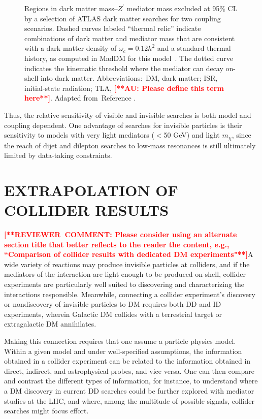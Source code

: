 \documentclass{ar-1col}
\newcommand{\chiDM}{\ensuremath{\chi}\xspace}
\newcommand{\IP}{invisible particle}
\newcommand{\mdm}{\ensuremath{m_{\chiDM}}\xspace}
\newcommand{\Zprime}{\ensuremath{{Z}^\prime}\xspace}
\begin{document}
\begin{figure}[!htpb]
\caption{Regions in dark matter mass--\Zprime mediator mass
excluded at 95\% CL by a selection of ATLAS dark matter searches
for two coupling scenarios. Dashed curves labeled ``thermal
relic'' indicate combinations of dark matter and mediator mass
that are consistent with a dark matter density of $\omega_c = 0.12
h^2$ and a standard thermal history, as computed in MadDM for this
model~\cite{Backovic:2015cra}. The dotted curve indicates the
kinematic threshold where the mediator can decay on-shell into
dark matter. Abbreviations:\ DM, dark matter; ISR, initial-state radiation; TLA, \textbf{\textcolor{red}{[**AU: Please define this term here**]}}. Adapted from~Reference .}
\label{fig:sensitivityComparison}
\end{figure}

Thus, the relative sensitivity of visible and invisible searches
is both model and coupling dependent. One advantage of
searches for {\IP}s is their sensitivity to models
with very light mediators ($<$50 GeV) and light \mdm, since the
reach of dijet and dilepton searches to low-mass resonances is
still ultimately limited by data-taking constraints.

\section{EXTRAPOLATION OF COLLIDER RESULTS}\label{sec:04_Extrapolation}

\textbf{\textcolor{red}{[**REVIEWER\ COMMENT: Please consider using an alternate section title that better reflects to the reader the content, e.g., ``Comparison of collider results with dedicated DM experiments"**]}}A wide variety of reactions may produce {\IP}s at colliders, and
if the mediators of the interaction are light enough to be
produced on-shell, collider experiments are particularly well suited to
discovering and characterizing the interactions responsible.
Meanwhile, connecting a collider experiment's discovery or
nondiscovery of {\IP}s to DM requires both DD and
ID experiments, wherein Galactic DM
collides with a terrestrial target or extragalactic DM
annihilates.

Making this connection requires that one assume a particle
physics model. Within a given model and under well-specified
assumptions, the information obtained in a collider experiment can
be related to the information obtained in direct, indirect, and
astrophysical probes, and vice versa. One can then compare and
contrast the different types of information, for instance, to understand
where a DM discovery in current DD searches could be further
explored with mediator studies at the LHC, and where, among the
multitude of possible signals, collider searches might focus
effort.
\end{document}
